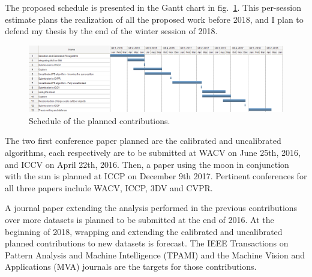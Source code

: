 \documentclass{report}
\begin{document}

The proposed schedule is presented in the Gantt chart in fig.~\ref{fig:schedule-gantt}. This per-session estimate plans the realization of all the proposed work before 2018, and I plan to defend my thesis by the end of the winter session of 2018.

\begin{figure}
\centering
\includegraphics[width=\linewidth]{schedule.png}
\caption{Schedule of the planned contributions.}
\label{fig:schedule-gantt}
\end{figure}

The two first conference paper planned are the calibrated and uncalibrated algorithms, each respectively are to be submitted at WACV on June 25th, 2016, and ICCV on April 22th, 2016. Then, a paper using the moon in conjunction with the sun is planned at ICCP on December 9th 2017. Pertinent conferences for all three papers include WACV, ICCP, 3DV and CVPR.

A journal paper extending the analysis performed in the previous contributions over more datasets is planned to be submitted at the end of 2016. At the beginning of 2018, wrapping and extending the calibrated and uncalibrated planned contributions to new datasets is forecast. The IEEE Transactions on Pattern Analysis and Machine Intelligence (TPAMI) and the Machine Vision and Applications (MVA) journals are the targets for those contributions.


\end{document}
